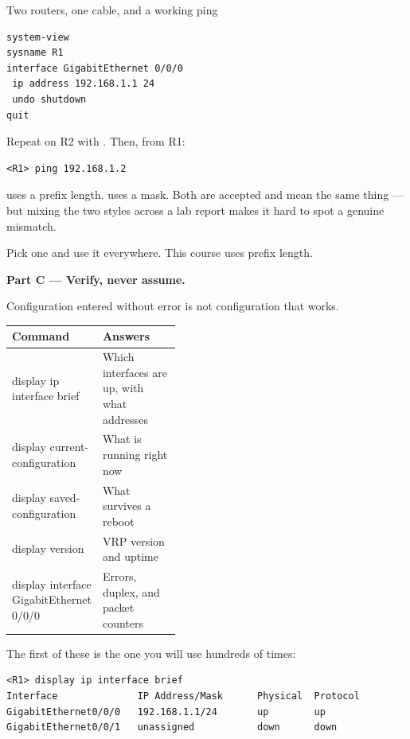 \begin{labproject}{Two routers, one cable, and a working ping}
\begin{lstlisting}[style=dcnterminal]
system-view
sysname R1
interface GigabitEthernet 0/0/0
 ip address 192.168.1.1 24
 undo shutdown
quit
\end{lstlisting}

Repeat on R2 with . Then, from R1:

\begin{lstlisting}[style=dcnterminal]
<R1> ping 192.168.1.2
\end{lstlisting}

\begin{pitfall}
 uses a prefix length.  uses a mask. Both are accepted and mean the same thing --- but mixing the two styles across a lab report makes it hard to spot a genuine mismatch.

Pick one and use it everywhere. This course uses prefix length.
\end{pitfall}

\medskip\noindent\textbf{Part C --- Verify, never assume.}\par
Configuration entered without error is not configuration that works.

\begin{commandmap}
\begin{tabularx}{\linewidth}{@{}>{\ttfamily}p{0.42\linewidth}X@{}}
\toprule
\rowcolor{MLPaleBlue!92}
\textrm{\bfseries Command} & \bfseries Answers \\
\midrule
display ip interface brief & Which interfaces are up, with what addresses \\
display current-configuration & What is running right now \\
display saved-configuration & What survives a reboot \\
display version & VRP version and uptime \\
display interface GigabitEthernet 0/0/0 & Errors, duplex, and packet counters \\
\bottomrule
\end{tabularx}
\end{commandmap}

The first of these is the one you will use hundreds of times:

\begin{lstlisting}[style=dcnterminal]
<R1> display ip interface brief
Interface              IP Address/Mask      Physical  Protocol
GigabitEthernet0/0/0   192.168.1.1/24       up        up
GigabitEthernet0/0/1   unassigned           down      down
\end{lstlisting}


\end{labproject}
